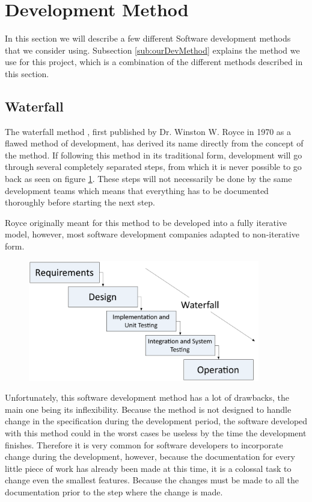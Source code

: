 \section{Development Method}
\label{sec:DevelopmentMethods}
In this section we will describe a few different Software development methods that we consider using.
Subsection \ref{sub:ourDevMethod} explains the method we use for this project, which is a combination of the different methods described in this section.

\subsection{Waterfall}
The waterfall method \cite{waterfallroyce}, first published by Dr. Winston W. Royce in 1970 as a flawed method of development, has derived its name directly from the concept of the method. If following this method in its traditional form, development will go through several completely separated steps, from which it is never possible to go back as seen on figure \ref{fig:WaterfallPic}. These steps will not necessarily be done by the same development teams which means that everything has to be documented thoroughly before starting the next step.

Royce originally meant for this method to be developed into a fully iterative model, however, most software development companies adapted to non-iterative form.

\begin{figure}[H]
	\centering
		\includegraphics[width=0.90\textwidth]{input/implementation/development/waterfall.pdf}
	\label{fig:WaterfallPic}
\end{figure}

Unfortunately, this software development method has a lot of drawbacks, the main one being its inflexibility.
Because the method is not designed to handle change in the specification during the development period, the software developed with this method could in the worst cases be useless by the time the development finishes.
Therefore it is very common for software developers to incorporate change during the development, however, because the documentation for every little piece of work has already been made at this time, it is a colossal task to change even the smallest features.
Because the changes must be made to all the documentation prior to the step where the change is made. 

